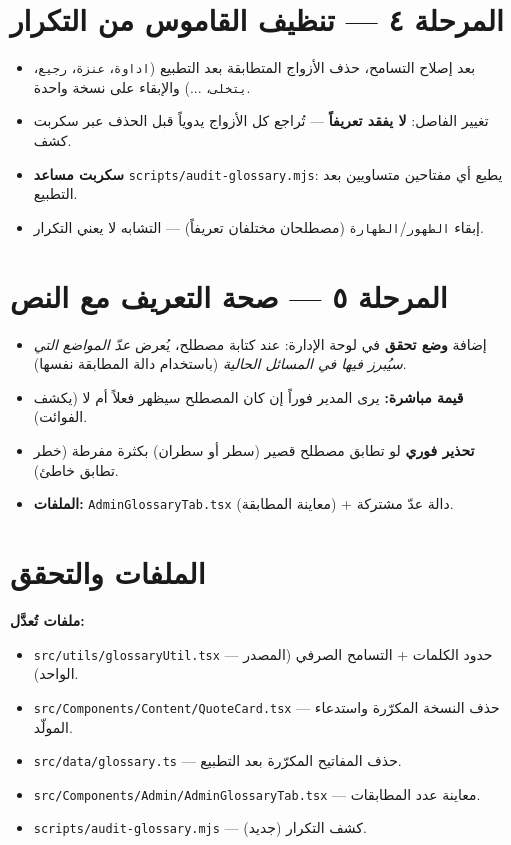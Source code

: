 \documentclass[11pt]{article}
\begin{document}
\section{المرحلة ٤ — تنظيف القاموس من التكرار}

\begin{itemize}
  \item بعد إصلاح التسامح، حذف الأزواج المتطابقة بعد التطبيع
        (\texttt{اداوة}، \texttt{عنزة}، \texttt{رجيع}، \texttt{يتخلى}، ...) والإبقاء على نسخة واحدة.
  \item تغيير الفاصل: \textbf{لا يفقد تعريفاً} — تُراجع كل الأزواج يدوياً قبل الحذف عبر سكربت كشف.
  \item \textbf{سكربت مساعد} \texttt{scripts/audit-glossary.mjs}: يطبع أي مفتاحين متساويين بعد التطبيع.
  \item إبقاء \texttt{الطهور}/\texttt{الطهارة} (مصطلحان مختلفان تعريفاً) — التشابه لا يعني التكرار.
\end{itemize}

\section{المرحلة ٥ — صحة التعريف مع النص}

\begin{itemize}
  \item إضافة \textbf{وضع تحقق} في لوحة الإدارة: عند كتابة مصطلح، يُعرض \emph{عدّ المواضع التي
        سيُبرز فيها في المسائل الحالية} (باستخدام دالة المطابقة نفسها).
  \item \textbf{قيمة مباشرة:} يرى المدير فوراً إن كان المصطلح سيظهر فعلاً أم لا (يكشف الفوائت).
  \item \textbf{تحذير فوري} لو تطابق مصطلح قصير (سطر أو سطران) بكثرة مفرطة (خطر تطابق خاطئ).
  \item \textbf{الملفات:} \texttt{AdminGlossaryTab.tsx} (معاينة المطابقة) + دالة عدّ مشتركة.
\end{itemize}

\section{الملفات والتحقق}

\textbf{ملفات تُعدَّل:}
\begin{itemize}
  \item \texttt{src/utils/glossaryUtil.tsx} — حدود الكلمات + التسامح الصرفي (المصدر الواحد).
  \item \texttt{src/Components/Content/QuoteCard.tsx} — حذف النسخة المكرّرة واستدعاء المولّد.
  \item \texttt{src/data/glossary.ts} — حذف المفاتيح المكرّرة بعد التطبيع.
  \item \texttt{src/Components/Admin/AdminGlossaryTab.tsx} — معاينة عدد المطابقات.
  \item \texttt{scripts/audit-glossary.mjs} — كشف التكرار (جديد).
\end{itemize}
\end{document}
